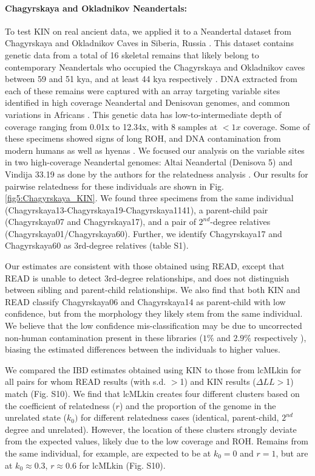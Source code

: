 \documentclass[12pt, letterpaper]{article}
\begin{document}
\paragraph{Chagyrskaya and Okladnikov Neandertals:}
To test KIN on real ancient data, we applied it to a Neandertal dataset from Chagyrskaya and Okladnikov Caves in Siberia, Russia \cite{kolobova_archaeological_2020-1, mafessoni_high-coverage_2020,skov_genetic_2022}. This dataset contains genetic data from a total of 16 skeletal remains that likely belong to contemporary Neandertals who occupied the Chagyrskaya and Okladnikov caves between 59 and 51 kya, and at least 44 kya respectively \cite{skov_genetic_2022}. DNA extracted from each of these remains were captured with an array targeting variable sites identified in high coverage Neandertal and Denisovan genomes, and common variations in Africans \cite{skov_genetic_2022}. This genetic data has  low-to-intermediate depth of coverage ranging from 0.01x to 12.34x, with 8 samples at  $<1x$ coverage. Some of these specimens showed signs of long ROH, and DNA contamination from modern humans as well as hyenas \cite{skov_genetic_2022}. We focused our analysis on the variable sites in two high-coverage Neandertal genomes: Altai Neandertal (Denisova 5) \cite{prufer_complete_2014} and Vindija 33.19 \cite{prufer_high-coverage_2017} as done by the authors for the relatedness analysis \cite{skov_genetic_2022}. Our results for pairwise relatedness for these individuals are shown in Fig.\ref{fig5:Chagyrskaya_KIN}. We found three specimens from the same  individual (Chagyrskaya13-Chagyrskaya19-Chagyrskaya1141), a parent-child pair (Chagyrskaya07 and Chagyrskaya17), and a pair of  $2^{nd}$-degree relatives (Chagyrskaya01/Chagyrskaya60). Further, we identify Chagyrskaya17 and Chagyrskaya60 as 3rd-degree relatives (table S1).

Our estimates are consistent with those obtained using READ, except that READ is unable to detect 3rd-degree relationships, and does not distinguish between sibling and parent-child relationships. We also find that both KIN and READ classify Chagyrskaya06 and Chagyrskaya14 as parent-child with low confidence, but from the morphology they likely stem from the same individual. We believe that the low confidence mis-classification may be due to uncorrected non-human contamination present in these libraries ($1\%$ and $2.9\%$ respectively \cite{skov_genetic_2022}), biasing the estimated differences between the individuals to higher values.

We compared the IBD estimates obtained using KIN to those from lcMLkin for all pairs for whom READ results (with s.d. $>$1) and KIN results ($\Delta LL>$1) match (Fig. S10). We find that lcMLkin creates four different clusters based on the coefficient of relatedness ($r$) and the proportion of the genome in the unrelated state ($k_0)$ for different relatedness cases (identical, parent-child, $2^{nd}$ degree and unrelated). However, the location of these clusters strongly deviate from the expected values, likely due to the low coverage and ROH. Remains from the same individual, for example, are expected to be at $k_0 = 0$ and $r = 1$, but are at $k_0 \approx 0.3$, $r \approx 0.6$ for lcMLkin (Fig. S10).
\end{document}
